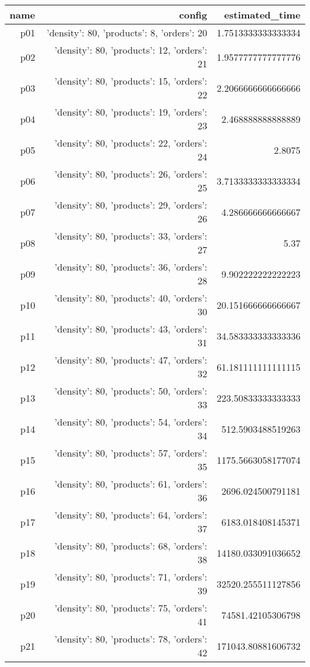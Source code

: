 \documentclass{article}
\begin{document}
                            \begin{center}
                            \scriptsize
                            \begin{tabular}{r|r|r}
                            name & config & estimated\_time\\\midrule
                              p01&{'density': 80, 'products': 8, 'orders': 20}&1.7513333333333334\\
  p02&{'density': 80, 'products': 12, 'orders': 21}&1.9577777777777776\\
  p03&{'density': 80, 'products': 15, 'orders': 22}&2.2066666666666666\\
  p04&{'density': 80, 'products': 19, 'orders': 23}&2.468888888888889\\
  p05&{'density': 80, 'products': 22, 'orders': 24}&2.8075\\
  p06&{'density': 80, 'products': 26, 'orders': 25}&3.7133333333333334\\
  p07&{'density': 80, 'products': 29, 'orders': 26}&4.286666666666667\\
  p08&{'density': 80, 'products': 33, 'orders': 27}&5.37\\
  p09&{'density': 80, 'products': 36, 'orders': 28}&9.902222222222223\\
  p10&{'density': 80, 'products': 40, 'orders': 30}&20.151666666666667\\
  p11&{'density': 80, 'products': 43, 'orders': 31}&34.583333333333336\\
  p12&{'density': 80, 'products': 47, 'orders': 32}&61.181111111111115\\
  p13&{'density': 80, 'products': 50, 'orders': 33}&223.50833333333333\\
  p14&{'density': 80, 'products': 54, 'orders': 34}&512.5903488519263\\
  p15&{'density': 80, 'products': 57, 'orders': 35}&1175.5663058177074\\
  p16&{'density': 80, 'products': 61, 'orders': 36}&2696.024500791181\\
  p17&{'density': 80, 'products': 64, 'orders': 37}&6183.018408145371\\
  p18&{'density': 80, 'products': 68, 'orders': 38}&14180.033091036652\\
  p19&{'density': 80, 'products': 71, 'orders': 39}&32520.255511127856\\
  p20&{'density': 80, 'products': 75, 'orders': 41}&74581.42105306798\\
  p21&{'density': 80, 'products': 78, 'orders': 42}&171043.80881606732\\

\end{tabular}
\end{center}
\end{document}
